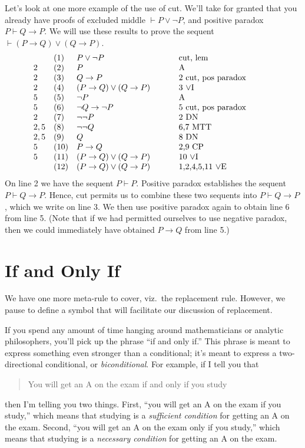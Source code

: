Let's look at one more example of the use of cut.  We'll take for
granted that you already have proofs of excluded middle
$\vdash P\vee \neg P$, and positive paradox $P\vdash Q\to P$.  We will
use these results to prove the sequent $\vdash (P\to Q)\vee (Q\to P)$.
\[ \begin{array}{l l >{$}p{4cm}<{$} p{4cm}}\
       & (1) & P\vee \neg P  &   cut, lem \\
     2 & (2) & P             &   A \\
     2 & (3) & Q\to P        &   2 cut, pos paradox \\
     2 & (4) & (P\to Q)\vee (Q\to P) & 3 $\vee$I \\
     5 & (5) & \neg P        &   A \\
     5 & (6) & \neg Q\to \neg P & 5 cut, pos paradox \\
     2 & (7) & \neg \neg P   & 2 DN \\
     2,5 & (8) & \neg\neg Q   & 6,7 MTT \\
     2,5 & (9) & Q            & 8 DN \\
     5   & (10) & P\to Q       & 2,9 CP \\
     5   & (11) & (P\to Q)\vee (Q\to P) & 10 $\vee$I \\
         & (12) & (P\to Q)\vee (Q\to P) & 1,2,4,5,11 $\vee$E                                
   \end{array} \]
 On line 2 we have the sequent $P\vdash P$.  Positive paradox establishes
 the sequent $P\vdash Q\to P$.  Hence, cut permits us to combine these
 two sequents into $P\vdash Q\to P$, which we write on line 3.  
 We then use positive paradox again to obtain line 6 from line 5.
 (Note that if we had permitted ourselves to use negative paradox, then
 we could immediately have obtained $P\to Q$ from line 5.)


\section{If and Only If}

We have one more meta-rule to cover, viz.\ the replacement rule.
However, we pause to define a symbol that will facilitate our
discussion of replacement.

If you spend any amount of time hanging around mathematicians or
analytic philosophers, you'll pick up the phrase ``if and only if.''
This phrase is meant to express something even stronger than a
conditional; it's meant to express a two-directional conditional, or
\emph{\gls{biconditional}}.  For example, if I tell you that
\begin{quote} You will get an A on the exam if and only if you
  study \end{quote} then I'm telling you two things.  First, ``you
will get an A on the exam if you study,'' which means that studying is
a \emph{sufficient condition} for getting an A on the exam.  Second,
``you will get an A on the exam only if you study,'' which means that
studying is a \emph{necessary condition} for getting an A on the exam.

